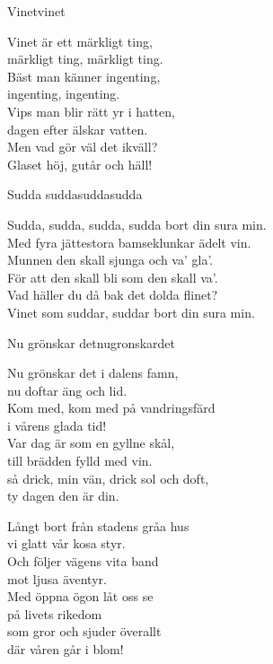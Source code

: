 \newpage

\begin{song}{Vinet}{vinet}
\begin{vers}
Vinet är ett märkligt ting,\\
märkligt ting, märkligt ting.\\
Bäst man känner ingenting,\\
ingenting, ingenting.\\
Vips man blir rätt yr i hatten,\\
dagen efter älskar vatten.\\
Men vad gör väl det ikväll?\\
Glaset höj, gutår och häll!\\
\end{vers}
\end{song}

\begin{song}{Sudda sudda}{suddasudda}
\begin{vers}
Sudda, sudda, sudda, sudda bort din sura min.\\
Med fyra jättestora bamseklunkar ädelt vin.\\
Munnen den skall sjunga och va' gla'.\\
För att den skall bli som den skall va'.\\
Vad häller du då bak det dolda flinet?\\
Vinet som suddar, suddar bort din sura min.\\
\end{vers}
\end{song}

\newpage

\begin{song}{Nu grönskar det}{nugronskardet}
\begin{vers}
Nu grönskar det i dalens famn, \\
nu doftar äng och lid.\\
Kom med, kom med på vandringsfärd\\
i vårens glada tid!\\
Var dag är som en gyllne skål,\\
till brädden fylld med vin.\\
så drick, min vän, drick sol och doft,\\
ty dagen den är din.\\
\end{vers}
\begin{vers}
Långt bort från stadens gråa hus \\
vi glatt vår kosa styr.\\
Och följer vägens vita band\\
mot ljusa äventyr.\\
Med öppna ögon låt oss se\\
på livets rikedom\\
som gror och sjuder överallt\\
där våren går i blom!\\
\end{vers}
\end{song}

